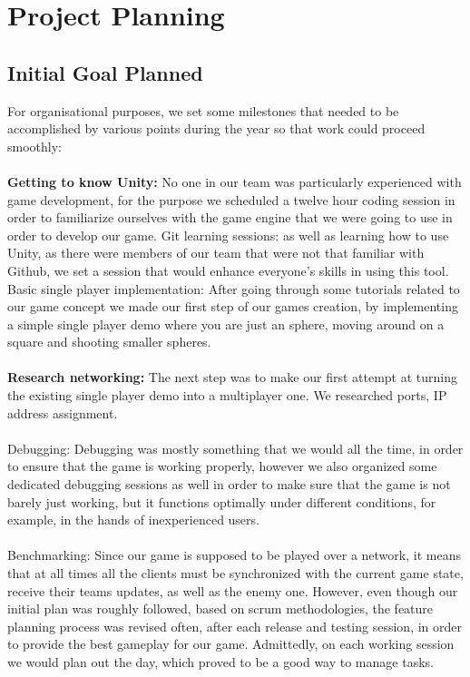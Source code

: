 \documentclass[11pt,a4paper]{article}
\begin{document}
\pagebreak



        \section{Project Planning}

        \subsection{Initial Goal Planned}

        For organisational purposes, we set some milestones that needed to be accomplished by various points during the year so that work could proceed smoothly: \\ \\

        \textbf{Getting to know Unity:} No one in our team was particularly experienced with game development, for the purpose we scheduled a twelve hour coding session in order to familiarize ourselves with the game engine that we were going to use in order to develop our game.
        Git learning sessions: as well as learning how to use Unity, as there were members of our team that were not that familiar with Github, we set a session that would enhance everyone’s skills in using this tool.
        Basic single player implementation: After going through some tutorials related to our game concept we made our first step of our games creation, by implementing a simple single player demo where you are just an sphere, moving around on a square and shooting smaller spheres. \\ \\

        \textbf{Research networking:} The next step was to make our first attempt at turning the existing single player demo into a multiplayer one. We researched ports, IP address assignment. \\ \\
        Debugging: Debugging was mostly something that we would all the time, in order to ensure that the game is working properly, however we also organized some dedicated debugging sessions as well in order to make sure that the game is not barely just working, but it functions optimally under different conditions, for example, in the hands of inexperienced users. \\ \\
        Benchmarking: Since our game is supposed to be played over a network, it means that at all times all the clients must be synchronized with the current game state, receive their teams updates, as well as the enemy one. 
        However, even though our initial plan was roughly followed, based on scrum methodologies, the feature planning process was revised often, after each release and testing session, in order to provide the best gameplay for our game. Admittedly, on each working session we would plan out the day, which proved to be a good way to manage tasks.
\end{document}
